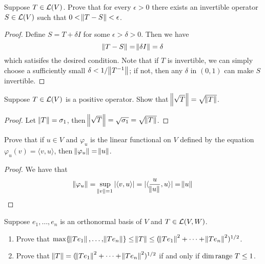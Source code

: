 \documentclass{extarticle}
\begin{document}
\begin{problem}{9}
    Suppose \(T \in \mathcal{L}(V)\). Prove that for every \(\epsilon > 0\)
    there exists an invertible operator \(S \in \mathcal{L}(V)\)
    such that \(0 < \norm{T - S } < \epsilon\).
\end{problem}

\begin{proof}
Define \(S = T + \delta I\) for some \(\epsilon > \delta > 0\). Then we 
have 
\[\norm{T - S} = \norm{\delta I} = \delta \]
which satisifes the desired condition. Note that if \(T\) is invertible, we can 
simply choose a sufficiently small \(\delta < 1/\norm{T^{-1}}\); if not, then any 
\(\delta\) in \((0, 1)\) can make \(S\) invertible. 
\end{proof}




\begin{problem}{12}
    Suppose \(T \in \mathcal{L}(V)\) is a positive operator. Show 
    that \(\norm{\sqrt{T}} = \sqrt{\norm{T}}\). 
\end{problem}

\begin{proof}
Let \(\norm{T} = \sigma_1\), then \(\norm{\sqrt{T}} 
= \sqrt{\sigma_1} = \sqrt{\norm{T}}\). 
\end{proof}

\begin{problem}{17}
    Prove that if \(u \in V\) and \(\varphi_u\) is the linear functional on \(V\) defined 
    by the equation \(\varphi_u(v) = \langle v,u \rangle\), then \(\norm{\varphi_u} = \norm{u}\).
\end{problem}

\begin{proof}
We have that 
\[\norm{\varphi_u} = \sup_{\norm{v} = 1} |\langle v,u \rangle| = |\langle \frac{u}{\norm{u}},u \rangle| = \norm{u}\]
\end{proof}

\begin{problem}{18}
    Suppose \(e_1, \ldots, e_n\) is an orthonormal basis of \(V\) and \(T \in \mathcal{L}(V, W)\). 
    \begin{enumerate}[label=(\alph*)]
        \item Prove that \(\max\{\norm{Te_1}, \ldots, \norm{Te_n}\}\leq \norm{T} \leq (\norm{Te_1}^2 + \cdots + \norm{Te_n}^2)^{1/2}\).
        \item Prove that \(\norm{T} = (\norm{T e_1}^2 + \cdots + \norm{Te_n}^2)^{1/2}\) if and only 
        if \(\dim \text{range } T \leq 1\).
    \end{enumerate}
\end{problem}
\end{document}
